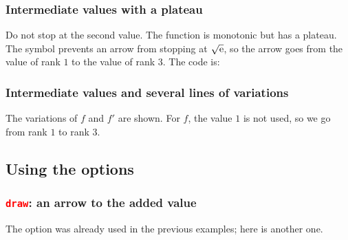 \subsubsection{Intermediate values with a plateau}

Do not stop at the second value. The function is monotonic but has a plateau. The symbol  prevents an arrow from stopping at $\sqrt{\mathrm{e}}$, so the arrow goes from the value of rank $1$ to the value of rank $3$. The code is:
\begin{tkzexample}
\end{tkzexample}

\begin{tkzexample}
\end{tkzexample}


\subsubsection{Intermediate values and several lines of variations}

The variations of $f$ and $f'$ are shown. For $f$, the value $1$ is not used, so we go from rank $1$ to rank $3$.

\begin{tkzexample}
\end{tkzexample}

\subsection{Using the options}

\subsubsection{\texttt{\textcolor{red}{draw}}: an arrow to the added value}
The option was already used in the previous examples; here is another one.

